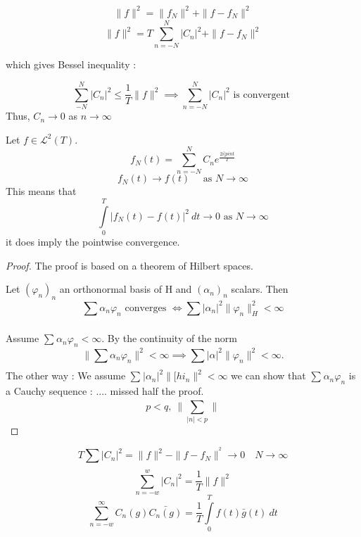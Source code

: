 \begin{defn}
    \[ \| f \|^{ 2}_{ }  = \| f_N \|^{ 2}_{ }  + \| f - f_N \|^{ 2}_{ } \]
    \[
    \| f \|^{ 2}_{ } = T \sum_{n = -N}^{N} \left | C_n \right | ^2 + \| f - f_N \|^{ 2}_{ } 
    \]
\end{defn}
which gives Bessel inequality : 
\begin{defn}
    \[
    \sum_{-N}^{N} \left | C_n \right | ^2 \leq \frac{ 1 }{ T } \| f \|^{ 2}_{ } \implies
    \sum_{n = -N}^{N} \left | C_n \right | ^2 \text{ is convergent } 
    \]
    Thus, $ C_n \to 0 $ as $ n \to \infty  $
    
    \label{def:?}
    \label{def:Bessel inequality}
\end{defn}
\begin{ftheo}
    Let $ f \in \mathscr{ L } ^2(T) $. 
    \[
        f_N(t) = \sum_{n=-N}^{N} C_n e^ \frac{ 2i]pi nt }{ T } 
    \]
    \[
        f_N(t) \to f(t) \quad \text{ as } N \to \infty 
    \] 
    This means that 
    \[
        \int\limits_{0}^{T} \left | f_N(t) - f(t)  \right | ^2 \ dt \to 0 \text{ as } N \to
        \infty 
    \]
    it does imply the pointwise convergence.        
    \label{th:Theorem of Convergence in $ \mathscr{ L } ^2 $}
\end{ftheo}
\begin{proof}
    The proof is based on a theorem of Hilbert spaces. 
    \begin{ftheo}[]
        Let $ \left( \varphi_n\right) _n $ an orthonormal basis of H and $ \left( \alpha _
        n \right) _n $ scalars. 
        Then 
        \[
        \sum_{}^{} \alpha_n \varphi_n \text{ converges } \iff \sum_{}^{} \left | \alpha_n
        \right | ^2 \| \varphi_n \|^{ 2}_{ H} < \infty 
        \]
        \label{th:}
    \end{ftheo}
    Assume $ \sum_{}^{} \alpha_n \varphi_n < \infty$. By the continuity of the norm 
    \[
    \| \sum_{}^{} \alpha_n \varphi_n  \|^{ 2}_{ } < \infty \implies \sum_{}^{} \left |
    \alpha \right | ^2 \| \varphi _n \|^{ 2}_{ }  < \infty. 
    \]
    The other way : 
    We assume $ \sum_{}^{} \left | \alpha_n \right | ^2 \| [hi_n \|^{ 2}_{ } < \infty $ we
    can show that $ \sum_{}^{} \alpha_n \varphi_n $ is a Cauchy sequence : .... missed
    half the proof. 
    \[
    p < q, \ \| \sum_{ \left | n \right | < p }^{}  \|^{ }_{ } 
    \]
\end{proof}


\begin{ftheo}
    \[
    T \sum_{}^{} \left | C_n \right | ^2 = \| f \|^{ 2}_{ } - \| f - f_N \|^{ ^2}_{ } \to
    0 \quad N \to \infty 
    \]
    \[
    \sum_{n=-w}^{w} \left | C_n \right | ^2 = \frac{ 1 }{ T } \| f \|^{ 2}_{ } 
    \]
    \[
        \sum_{n=-w}^{\infty} C_n(g)\bar{C_n(g)} = \frac{ 1 }{ T } \int\limits_{0}^{T} f(t)
        \bar{g}(t) \ dt
    \]
    \label{th:Perseval equality}
\end{ftheo}

